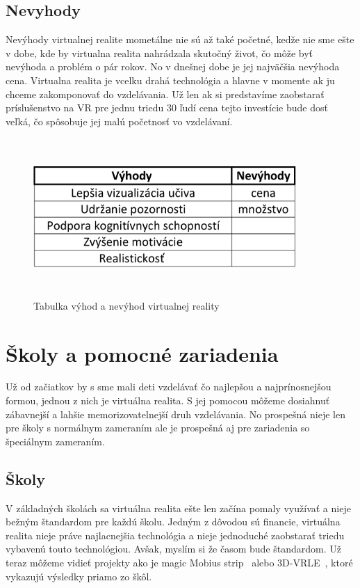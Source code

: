 \documentclass[10pt,oneside,slovak,a4paper]{article}
\begin{document}
\subsection{Nevyhody} \label{procon:nevyhody}
Nevýhody virtualnej realite mometálne nie sú až také početné, kedže nie sme ešte v dobe, kde by virtualna realita nahrádzala skutočný život, čo môže byť nevýhoda a problém o pár rokov. No v dnešnej dobe je jej najväčšia nevýhoda cena. Virtualna realita je vcelku drahá technológia a hlavne v momente ak ju chceme zakomponovať do vzdelávania. Už len ak si predstavíme zaobstarať príslušenstvo na VR pre jednu triedu 30 ľudí cena tejto investície bude dosť veľká, čo spôsobuje jej malú početnosť vo vzdelávaní.  

\begin{figure} 
	\centering
	\includegraphics[width=10cm,height=6cm,keepaspectratio]{VR_tabulka-crop}
	\caption[VR_tabulka-crop]{Tabulka výhod a nevýhod virtualnej reality}
	\label{tabulka}
\end{figure} 

\section{Školy a pomocné zariadenia} \label{školy}
Už od začiatkov by s sme mali deti vzdelávať čo najlepšou a najprínosnejšou formou, jednou z nich je virtuálna realita. S jej pomocou môžeme dosiahnuť zábavnejší a lahšie memorizovatelnejší druh vzdelávania. No prospešná nieje len pre školy s normálnym zameraním ale je prospešná aj pre zariadenia so špeciálnym zameraním. 

\subsection{Školy} \label{školy:školy}
V základných školách sa virtuálna realita ešte len začína pomaly využívať a nieje bežným štandardom pre každú školu. Jedným z dôvodou sú financie, virtuálna realita nieje práve najlacnejšia technológia a nieje jednoduché zaobstarať triedu vybavenú touto technológiou. Avšak, myslím si že časom bude štandardom. Už teraz môžeme vidieť projekty ako je magic Mobius strip~\cite{Math} alebo 3D-VRLE~\cite{Physics}, ktoré vykazujú výsledky priamo zo škôl. 
\end{document}
